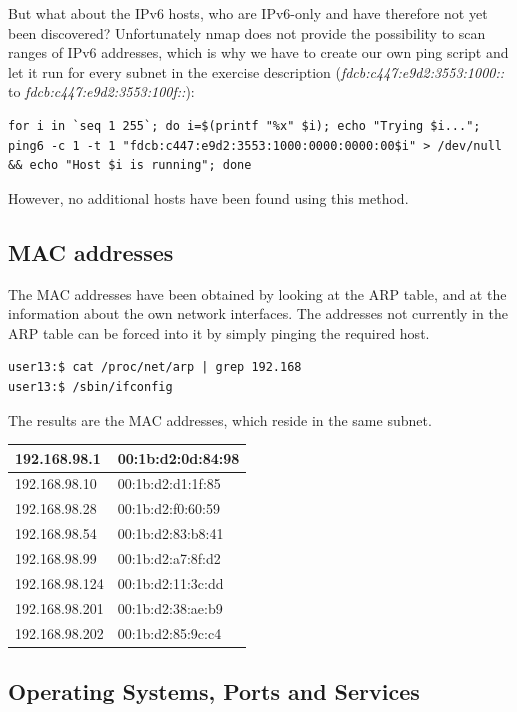\documentclass[12pt,a4paper,titlepage,oneside]{scrartcl}
\begin{document}
But what about the IPv6 hosts, who are IPv6-only and have therefore not yet been discovered? Unfortunately nmap does not provide the possibility to scan ranges of IPv6 addresses, which is why we have to create our own ping script and let it run for every subnet in the exercise description (\emph{fdcb:c447:e9d2:3553:1000::} to \emph{fdcb:c447:e9d2:3553:100f::}):

\begin{lstlisting}[style=simple]
for i in `seq 1 255`; do i=$(printf "%x" $i); echo "Trying $i..."; ping6 -c 1 -t 1 "fdcb:c447:e9d2:3553:1000:0000:0000:00$i" > /dev/null && echo "Host $i is running"; done
\end{lstlisting}

However, no additional hosts have been found using this method.

\subsection{MAC addresses}

The MAC addresses have been obtained by looking at the ARP table, and at the information about the own network interfaces. The addresses not currently in the ARP table can be forced into it by simply pinging the required host.

\begin{lstlisting}[style=simple]
user13:$ cat /proc/net/arp | grep 192.168
user13:$ /sbin/ifconfig
\end{lstlisting}

The results are the MAC addresses, which reside in the same subnet.

\begin{tabular}{| l | l |}
\hline
192.168.98.1 & 00:1b:d2:0d:84:98 \\ \hline
192.168.98.10 & 00:1b:d2:d1:1f:85 \\ \hline
192.168.98.28 & 00:1b:d2:f0:60:59 \\ \hline
192.168.98.54 & 00:1b:d2:83:b8:41 \\ \hline
192.168.98.99 & 00:1b:d2:a7:8f:d2 \\ \hline
192.168.98.124 & 00:1b:d2:11:3c:dd \\ \hline
192.168.98.201 & 00:1b:d2:38:ae:b9 \\ \hline
192.168.98.202 & 00:1b:d2:85:9c:c4 \\ \hline
\end{tabular}

\subsection{Operating Systems, Ports and Services}
\end{document}

